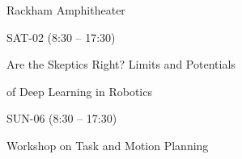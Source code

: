 \documentclass{article}
\begin{document}
\rssheader[2in]

\rssbig
\begin{center}
Rackham Amphitheater
\end{center}

\vfill

\rssmed
\begin{center}
SAT-02 (8:30 -- 17:30)
\end{center}

\rsssm
\begin{center}
Are the Skeptics Right? Limits and Potentials \par \noindent of Deep Learning
in Robotics
\end{center}

\vfill

\rssmed
\begin{center}
SUN-06 (8:30 -- 17:30)
\end{center}

\rsssm
\begin{center}
Workshop on Task and Motion Planning
\end{center}

\vfill
\end{document}
